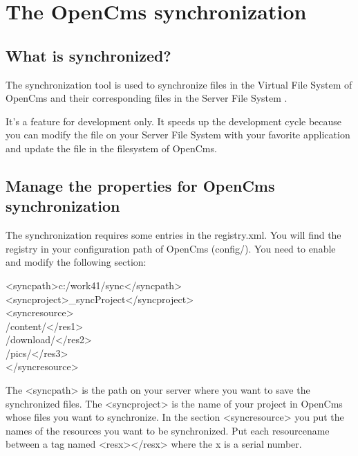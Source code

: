 \chapter{The OpenCms synchronization}
\label{synchronization}

\section{What is synchronized?}
The synchronization tool  is used to synchronize  files in the Virtual File System  of OpenCms and their corresponding files in the Server File System .

It's a feature for development only. It speeds up the development cycle because you can modify the file on your Server File System with your favorite application and update the file in the filesystem of OpenCms.

\section{Manage the properties for OpenCms synchronization}
The synchronization requires some entries in the {\dir
registry.xml}. You will find the registry in your configuration
path of OpenCms ({\dir config/}). You need to enable and modify
the following section:

\begin{xml}
<syncpath>c:/work41/sync</syncpath>\\
<syncproject>\_syncProject</syncproject>\\
<syncresource>\\
/content/</res1>\\
/download/</res2>\\
/pics/</res3>\\
</syncresource>\\
\end{xml}

The {\tag <syncpath>}  is the path on your server
where you want to save the synchronized files. The {\tag
<syncproject>}  is the name of your project in
OpenCms whose files you want to synchronize. In the section {\tag
<syncresource>}  you put the names of the
resources you want to be synchronized. Put each resourcename
between a tag named {\tag <resx></resx>} where the {\name x} is a
serial number.

